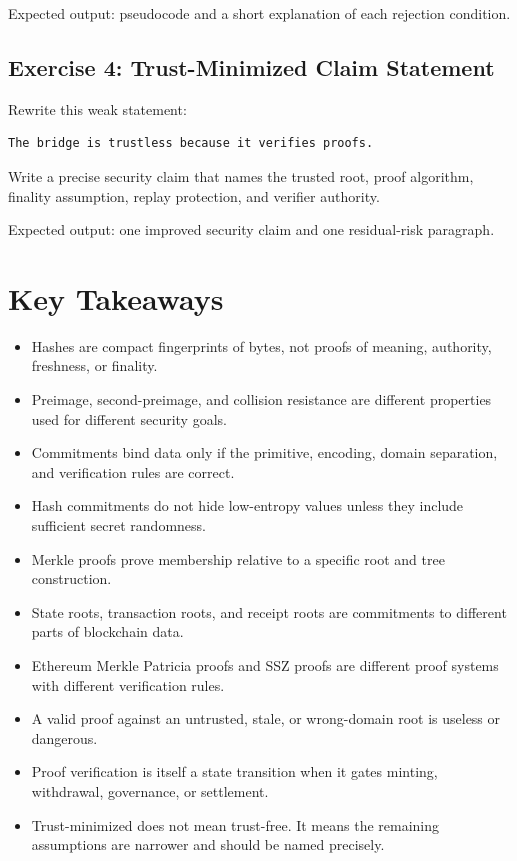 Expected output: pseudocode and a short explanation of each rejection condition.

\subsection{Exercise 4: Trust-Minimized Claim Statement}

Rewrite this weak statement:

\begin{lstlisting}
The bridge is trustless because it verifies proofs.
\end{lstlisting}

Write a precise security claim that names the trusted root, proof algorithm, finality assumption, replay protection, and verifier authority.

Expected output: one improved security claim and one residual-risk paragraph.

\section{Key Takeaways}

\begin{itemize}
\tightlist
\item
  Hashes are compact fingerprints of bytes, not proofs of meaning,
  authority, freshness, or finality.
\item
  Preimage, second-preimage, and collision resistance are different
  properties used for different security goals.
\item
  Commitments bind data only if the primitive, encoding, domain
  separation, and verification rules are correct.
\item
  Hash commitments do not hide low-entropy values unless they include
  sufficient secret randomness.
\item
  Merkle proofs prove membership relative to a specific root and tree
  construction.
\item
  State roots, transaction roots, and receipt roots are commitments to
  different parts of blockchain data.
\item
  Ethereum Merkle Patricia proofs and SSZ proofs are different proof
  systems with different verification rules.
\item
  A valid proof against an untrusted, stale, or wrong-domain root is
  useless or dangerous.
\item
  Proof verification is itself a state transition when it gates minting,
  withdrawal, governance, or settlement.
\item
  Trust-minimized does not mean trust-free. It means the remaining
  assumptions are narrower and should be named precisely.
\end{itemize}

